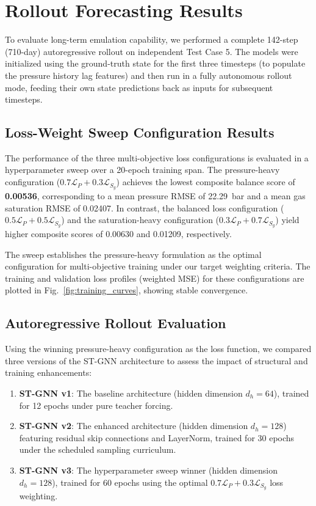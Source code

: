 \section{Rollout Forecasting Results}
To evaluate long-term emulation capability, we performed a complete 142-step (710-day) autoregressive rollout on independent Test Case 5. The models were initialized using the ground-truth state for the first three timesteps (to populate the pressure history lag features) and then run in a fully autonomous rollout mode, feeding their own state predictions back as inputs for subsequent timesteps.

\subsection{Loss-Weight Sweep Configuration Results}
The performance of the three multi-objective loss configurations is evaluated in a hyperparameter sweep over a 20-epoch training span. The pressure-heavy configuration ($0.7\mathcal{L}_P + 0.3\mathcal{L}_{S_g}$) achieves the lowest composite balance score of \textbf{0.00536}, corresponding to a mean pressure RMSE of 22.29~bar and a mean gas saturation RMSE of 0.02407. In contrast, the balanced loss configuration ($0.5\mathcal{L}_P + 0.5\mathcal{L}_{S_g}$) and the saturation-heavy configuration ($0.3\mathcal{L}_P + 0.7\mathcal{L}_{S_g}$) yield higher composite scores of 0.00630 and 0.01209, respectively. 

The sweep establishes the pressure-heavy formulation as the optimal configuration for multi-objective training under our target weighting criteria. The training and validation loss profiles (weighted MSE) for these configurations are plotted in Fig.~\ref{fig:training_curves}, showing stable convergence.

\subsection{Autoregressive Rollout Evaluation}
Using the winning pressure-heavy configuration as the loss function, we compared three versions of the ST-GNN architecture to assess the impact of structural and training enhancements:
\begin{enumerate}
    \item \textbf{ST-GNN v1}: The baseline architecture (hidden dimension $d_h = 64$), trained for 12 epochs under pure teacher forcing.
    \item \textbf{ST-GNN v2}: The enhanced architecture (hidden dimension $d_h = 128$) featuring residual skip connections and LayerNorm, trained for 30 epochs under the scheduled sampling curriculum.
    \item \textbf{ST-GNN v3}: The hyperparameter sweep winner (hidden dimension $d_h = 128$), trained for 60 epochs using the optimal $0.7\mathcal{L}_P + 0.3\mathcal{L}_{S_g}$ loss weighting.
\end{enumerate}


